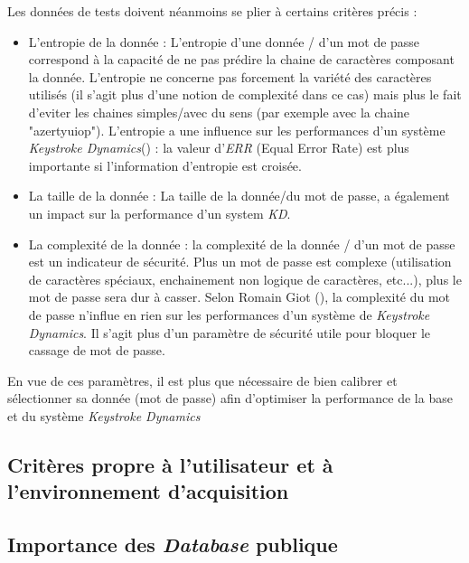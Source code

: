 Les données de tests doivent néanmoins se plier à certains critères précis :

\begin{itemize}
\item L'entropie de la donnée : L'entropie d'une donnée / d'un mot de passe correspond à la capacité de ne pas prédire la chaine de caractères composant la donnée. L'entropie ne concerne pas forcement la variété des caractères utilisés (il s'agit plus d'une notion de complexité dans ce cas) mais plus le fait d'eviter les chaines simples/avec du sens (par exemple avec la chaine "azertyuiop"). L'entropie a une influence sur les performances d'un système \textit{Keystroke Dynamics}(\cite{giotWeb}) : la valeur d'\textit{ERR} (Equal Error Rate) est plus importante si l'information d'entropie est croisée.\\

\item La taille de la donnée : La taille de la donnée/du mot de passe, a également un impact sur la performance d'un system \textit{KD}.\\

\item La complexité de la donnée : la complexité de la donnée / d'un mot de passe est un indicateur de sécurité. Plus un mot de passe est complexe (utilisation de caractères spéciaux, enchainement non logique de caractères, etc...), plus le mot de passe sera dur à casser. Selon Romain Giot (\cite{giotWeb}), la complexité du mot de passe n'influe en rien sur les performances d'un système de \textit{Keystroke Dynamics}. Il s'agit plus d'un paramètre de sécurité utile pour bloquer le cassage de mot de passe.\\

\end{itemize}
En vue de ces paramètres, il est plus que nécessaire de bien calibrer et sélectionner sa donnée (mot de passe) afin d'optimiser la performance de la base et du système \textit{Keystroke Dynamics}

\subsection{Critères propre à l'utilisateur et à l'environnement d'acquisition}



\subsection{Importance des \textit{Database} publique}
